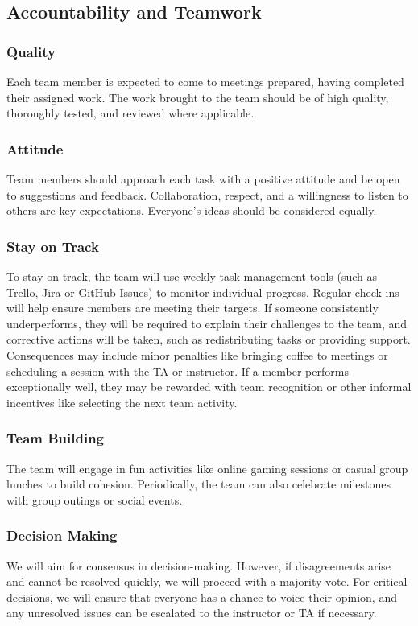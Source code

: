 \documentclass{article}
\begin{document}
\subsection*{Accountability and Teamwork}

\subsubsection*{Quality}

Each team member is expected to come to meetings prepared, having completed their assigned work. The work brought to the team should be of high quality, thoroughly tested, and reviewed where applicable.

\subsubsection*{Attitude}

Team members should approach each task with a positive attitude and be open to suggestions and feedback. Collaboration, respect, and a willingness to listen to others are key expectations. Everyone’s ideas should be considered equally.

\subsubsection*{Stay on Track}

To stay on track, the team will use weekly task management tools (such as Trello, Jira or GitHub Issues) to monitor individual progress. Regular check-ins will help ensure members are meeting their targets. If someone consistently underperforms, they will be required to explain their challenges to the team, and corrective actions will be taken, such as redistributing tasks or providing support. Consequences may include minor penalties like bringing coffee to meetings or scheduling a session with the TA or instructor. If a member performs exceptionally well, they may be rewarded with team recognition or other informal incentives like selecting the next team activity.

\subsubsection*{Team Building}

The team will engage in fun activities like online gaming sessions or casual group lunches to build cohesion. Periodically, the team can also celebrate milestones with group outings or social events.

\subsubsection*{Decision Making}

We will aim for consensus in decision-making. However, if disagreements arise and cannot be resolved quickly, we will proceed with a majority vote. For critical decisions, we will ensure that everyone has a chance to voice their opinion, and any unresolved issues can be escalated to the instructor or TA if necessary.
\end{document}
